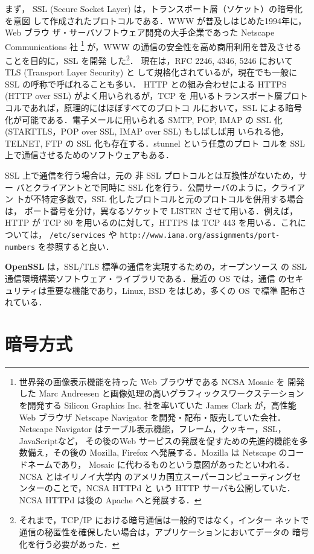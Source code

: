 まず，
SSL (Secure Socket Layer) は，トランスポート層（ソケット）の暗号化を意図
して作成されたプロトコルである．WWW が普及しはじめた1994年に，Web ブラウ
ザ・サーバソフトウェア開発の大手企業であった Netscape Communications 社
\footnote{世界発の画像表示機能を持った Web ブラウザである NCSA Mosaic を
開発した Marc Andreesen と画像処理の高いグラフィックスワークステーション
を開発する Silicon Graphics Inc. 社を率いていた James Clark が，高性能 
Web ブラウザ Netscape Navigator を開発・配布・販売していた会社．Netscape
Navigator はテーブル表示機能，フレーム，クッキー，SSL，JavaScriptなど，
その後のWeb サービスの発展を促すための先進的機能を多数備え，その後の 
Mozilla, Firefox へ発展する．Mozilla は Netscape のコードネームであり，
Mosaic に代わるものという意図があったといわれる．NCSA とはイリノイ大学内
のアメリカ国立スーパーコンピューティングセンターのことで，NCSA HTTPd と
いう HTTP サーバも公開していた．NCSA HTTPd は後の Apache へと発展する．}
が，WWW の通信の安全性を高め商用利用を普及させることを目的に，SSL を開発
した\footnote{それまで，TCP/IP における暗号通信は一般的ではなく，インター
ネットで通信の秘匿性を確保したい場合は，アプリケーションにおいてデータの
暗号化を行う必要があった．}．
現在は，RFC 2246, 4346, 5246 において TLS (Transport Layer Security) と
して規格化されているが，現在でも一般に SSL の呼称で呼ばれることも多い．
HTTP との組み合わせによる HTTPS (HTTP over SSL) がよく用いられるが，TCP を
用いるトランスポート層プロトコルであれば，原理的にはほぼすべてのプロトコ
ルにおいて，SSL による暗号化が可能である．電子メールに用いられる SMTP,
POP, IMAP の SSL 化 (STARTTLS，POP over SSL, IMAP over SSL) もしばしば用
いられる他，TELNET, FTP の SSL 化も存在する．stunnel という任意のプロト
コルを SSL 上で通信させるためのソフトウェアもある．

SSL 上で通信を行う場合は，元の 非 SSL プロトコルとは互換性がないため，サー
バとクライアントとで同時に SSL 化を行う．公開サーバのように，クライアン
トが不特定多数で，SSL 化したプロトコルと元のプロトコルを併用する場合は，
ポート番号を分け，異なるソケットで LISTEN させて用いる．例えば，HTTP が
TCP 80 を用いるのに対して，HTTPS は TCP 443 を用いる．これについては，
\texttt{/etc/services} や
\texttt{http://www.iana.org/assignments/port-numbers} を参照すると良い．

\textbf{OpenSSL} は，SSL/TLS 標準の通信を実現するための，オープンソース
 の SSL 通信環境構築ソフトウェア・ライブラリである．最近の OS では，通信
 のセキュリティは重要な機能であり，Linux, BSD をはじめ，多くの OS で標準
 配布されている．


\section{暗号方式}

